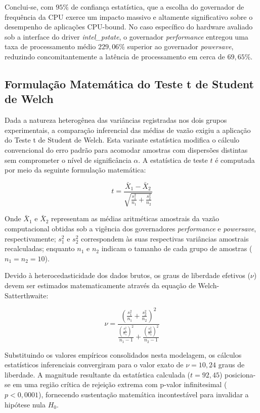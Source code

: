 \documentclass[12pt]{article}
\begin{document}
Conclui-se, com $95\%$ de confiança estatística, que a escolha do governador de frequência da CPU exerce um impacto massivo e altamente significativo sobre o desempenho de aplicações CPU-bound. No caso específico do hardware avaliado sob a interface do driver \textit{intel\_pstate}, o governador \textit{performance} entregou uma taxa de processamento médio $229,06\%$ superior ao governador \textit{powersave}, reduzindo concomitantemente a latência de processamento em cerca de $69,65\%$.

\subsection{Formulação Matemática do Teste t de Student de Welch}

Dada a natureza heterogênea das variâncias registradas nos dois grupos experimentais, a comparação inferencial das médias de vazão exigiu a aplicação do Teste t de Student de Welch. Esta variante estatística modifica o cálculo convencional do erro padrão para acomodar amostras com dispersões distintas sem comprometer o nível de significância $\alpha$. A estatística de teste $t$ é computada por meio da seguinte formulação matemática:

\begin{equation}
t = \frac{\bar{X}_1 - \bar{X}_2}{\sqrt{\frac{s_1^2}{n_1} + \frac{s_2^2}{n_2}}}
\end{equation}

Onde $\bar{X}_1$ e $\bar{X}_2$ representam as médias aritméticas amostrais da vazão computacional obtidas sob a vigência dos governadores \textit{performance} e \textit{powersave}, respectivamente; $s_1^2$ e $s_2^2$ correspondem às suas respectivas variâncias amostrais recalculadas; enquanto $n_1$ e $n_2$ indicam o tamanho de cada grupo de amostras ($n_1 = n_2 = 10$).

Devido à heterocedasticidade dos dados brutos, os graus de liberdade efetivos ($\nu$) devem ser estimados matematicamente através da equação de Welch-Satterthwaite:

\begin{equation}
\nu = \frac{\left( \frac{s_1^2}{n_1} + \frac{s_2^2}{n_2} \right)^2}{\frac{\left(\frac{s_1^2}{n_1}\right)^2}{n_1 - 1} + \frac{\left(\frac{s_2^2}{n_2}\right)^2}{n_2 - 1}}
\end{equation}

Substituindo os valores empíricos consolidados nesta modelagem, os cálculos estatísticos inferenciais convergiram para o valor exato de $\nu = 10,24$ graus de liberdade. A magnitude resultante da estatística calculada ($t = 92,45$) posiciona-se em uma região crítica de rejeição extrema com p-valor infinitesimal ($p < 0,0001$), fornecendo sustentação matemática incontestável para invalidar a hipótese nula $H_0$.
\end{document}
